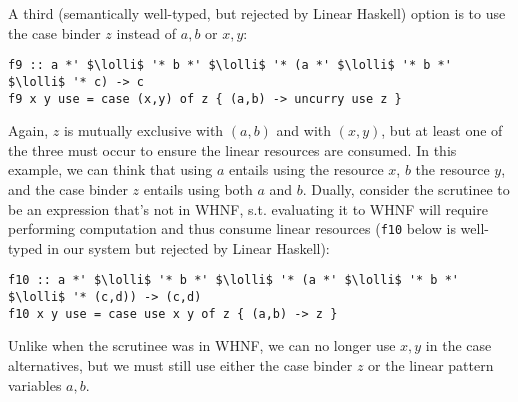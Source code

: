 \documentclass[acmsmall,review,anonymous,screen]{acmart}
\newcommand{\incode}[1]{\lstinline{#1}}
\newcommand{\lolli}{\multimap}
\begin{document}
A third (semantically well-typed, but rejected by Linear Haskell) option is to use the case binder $z$ instead of $a,b$ or $x,y$:
\begin{notyet}
\begin{lstlisting}
f9 :: a *' $\lolli$ '* b *' $\lolli$ '* (a *' $\lolli$ '* b *' $\lolli$ '* c) -> c
f9 x y use = case (x,y) of z { (a,b) -> uncurry use z }
\end{lstlisting}
\end{notyet}
Again, $z$ is mutually exclusive with $(a,b)$ and with $(x,y)$, but at least one of
the three must occur to ensure the linear resources are consumed. In this
example, we can think that using $a$ entails using the resource $x$, $b$ the
resource $y$, and the case binder $z$ entails using both $a$ and $b$.
%
Dually, consider the scrutinee to be an expression that's not in WHNF, s.t.
evaluating it to WHNF will require performing computation and thus consume linear
resources (\incode{f10} below is well-typed in our system but rejected
by Linear Haskell):
\begin{notyet}
\begin{lstlisting}
f10 :: a *' $\lolli$ '* b *' $\lolli$ '* (a *' $\lolli$ '* b *' $\lolli$ '* (c,d)) -> (c,d)
f10 x y use = case use x y of z { (a,b) -> z }
\end{lstlisting}
\end{notyet}
Unlike when the scrutinee was in WHNF, we can no longer use $x,y$ in the case
alternatives, but we must still use either the case binder $z$ or the linear
pattern variables $a,b$. %
%
\end{document}
